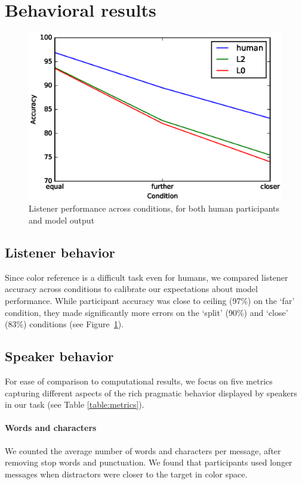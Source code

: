 \documentclass[11pt,letterpaper]{article}
\renewcommand{\|}{\mid}
\newcommand{\figref}[1]{Figure~\ref{#1}}
\begin{document}
\section{Behavioral results}

\begin{figure}
\includegraphics[scale = .5]{figures/allListenerAccuracy.eps}
\caption{Listener performance across conditions, for both human participants and model output}
\label{fig:listenerAccuracy}
\end{figure}

\subsection{Listener behavior}

Since color reference is a difficult task even for humans, we compared listener accuracy across conditions to calibrate our expectations about model performance. While participant accuracy was close to ceiling (97\%) on the `far' condition, they made significantly more errors on the `split' (90\%) and `close' (83\%) conditions (see \figref{fig:listenerAccuracy}).

\subsection{Speaker behavior}

For ease of comparison to computational results, we focus on five metrics capturing different aspects of the rich pragmatic behavior displayed by speakers in our task (see Table \ref{table:metrics}). 

\paragraph{Words and characters} We counted the average number of words and characters per message, after removing stop words and punctuation. We found that participants used longer messages when distractors were closer to the target in color space.
\end{document}
